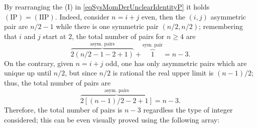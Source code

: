                 By rearranging the (I) in \eqref{eqSysMomDerUnclearIdentityP} it holds $(\text{IP})=(\text{IIP})$. Indeed, consider $n=i+j$ even, then the $(i,j)$ asymmetric pair are $n/2-1$ while there is one symmetric pair $(n/2,n/2)$; remembering that $i$ and $j$ start at $2$, the total number of pairs for $n\ge4$ are
                $$
                \overbrace{2(n/2-1-2+1)}^{\text{asym. pairs}}
                +\overbrace1^{\text{sym. pair}}
                =n-3.
                $$
                On the contrary, given $n=i+j$ odd, one has only asymmetric pairs which are unique up until $n/2$, but since $n/2$ is rational the real upper limit is $(n-1)/2$; thus, the total number of pairs are
                $$
                \overbrace{2[(n-1)/2-2+1]}^{\text{asym. pairs}}=n-3.
                $$
                Therefore, the total number of pairs is $n-3$ regardless the type of integer considered; this can be even visually proved using the following array:
                \newcommand\lineOverlap[5]{
                    \pgfmathsetmacro\wBase{.4} %
                    \pgfmathsetmacro\riNWC{#1} %
                    \pgfmathsetmacro\riSWC{#1+\wBase} %
                    \pgfmathsetmacro\riSEC{#3} %
                    \pgfmathsetmacro\riNEC{#3-\wBase} %
                    \pgfmathsetmacro\ciNWC{#2-\wBase} %
                    \pgfmathsetmacro\ciSWC{#2} %
                    \pgfmathsetmacro\ciSEC{#4+\wBase} %
                    \pgfmathsetmacro\ciNEC{#4} %
                    \tikz\fill[
                        overlay,
                        remember picture,
                        #5,
                        fill opacity=0.5,
                        rounded corners=7pt,
                    ]
                        (\riNWC-|\ciNWC) -- 
                        (\riSWC-|\ciSWC) -- 
                        (\riSEC-|\ciSEC) -- 
                        (\riNEC-|\ciNEC) -- cycle;
                }

